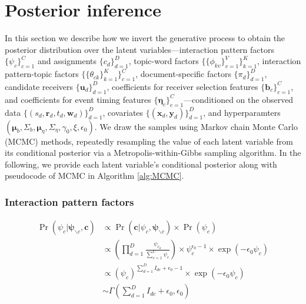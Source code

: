 \documentclass[ba]{imsart}
\numberwithin{equation}{section}
\theoremstyle{plain}
\begin{document}
	\section{Posterior inference}\label{sec:inference}
	In this section we describe how we invert the generative process to obtain the posterior distribution over the latent variables---interaction pattern factors $\{\psi_c\}_{c=1}^C$ and assignments $\{c_d\}_{d=1}^D$, topic-word factors $\{\{\phi_{kv}\}_{v=1}^V\}_{k=1}^K$, interaction pattern-topic factors $\{\{\theta_{ck}\}_{k=1}^K\}_{c=1}^C$, document-specific factors $\{\pi_{d}\}_{d=1}^D$, candidate receivers $\{\boldsymbol{u}_d\}_{d=1}^D$, coefficients for receiver selection features $\{\boldsymbol{b}_c\}_{c=1}^C$, and coefficients for event timing features $\{\boldsymbol{\eta}_c\}_{c=1}^C$---conditioned on the observed data $\{(s_d, \boldsymbol{r}_d, t_d, \boldsymbol{w}_d)\}_{d=1}^D$, covariates $\{(\boldsymbol{x}_d, \boldsymbol{y}_d)\}_{d=1}^D$, and hyperparamters $(\boldsymbol{\mu}_b, \Sigma_b, \boldsymbol{\mu}_\eta, \Sigma_\eta, \gamma_0, \xi, \epsilon_0)$. We draw the samples using Markov chain Monte Carlo (MCMC) methods, repeatedly resampling the value of each latent variable from its conditional posterior via a Metropolis-within-Gibbs sampling algorithm. In the following, we provide each latent variable's conditional posterior along with pseudocode of MCMC in Algorithm \ref{alg:MCMC}.
		\subsubsection{Interaction pattern factors}
		\begin{equation}
		\begin{aligned}
	\Pr(\psi_c|\boldsymbol{\psi}_{\backslash c}, \boldsymbol{c}) & \propto \Pr(\boldsymbol{c}|\psi_c, \boldsymbol{\psi}_{\backslash c}) \times \Pr(\psi_c)\\
	& \propto (\prod_{d=1}^D \frac{\psi_{c_d}}{\sum_{c=1}^C\psi_c} )\times \psi_c^{\epsilon_0-1} \times \exp(-\epsilon_0 \psi_c)\\
	&\propto (\psi_c)^{\sum_{d=1}^D I_{dc}+\epsilon_0-1}\times \exp(-\epsilon_0 \psi_c)\\
&	\sim \Gamma(\sum_{d=1}^D I_{dc}+\epsilon_0, \epsilon_0)
		\end{aligned}	
		\end{equation}
\end{document}
